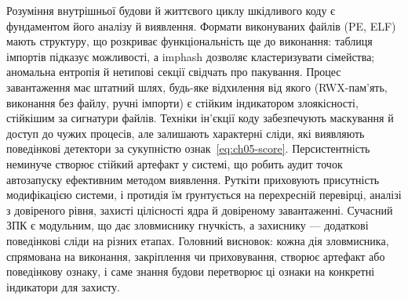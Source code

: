 Розуміння внутрішньої будови й життєвого циклу шкідливого коду є фундаментом його аналізу й виявлення. Формати виконуваних файлів (PE, ELF) мають структуру, що розкриває функціональність ще до виконання: таблиця імпортів підказує можливості, а imphash дозволяє кластеризувати сімейства; аномальна ентропія й нетипові секції свідчать про пакування. Процес завантаження має штатний шлях, будь-яке відхилення від якого (RWX-пам'ять, виконання без файлу, ручні імпорти) є стійким індикатором злоякісності, стійкішим за сигнатури файлів. Техніки ін'єкції коду забезпечують маскування й доступ до чужих процесів, але залишають характерні сліди, які виявляють поведінкові детектори за сукупністю ознак~\eqref{eq:ch05-score}. Персистентність неминуче створює стійкий артефакт у системі, що робить аудит точок автозапуску ефективним методом виявлення. Руткіти приховують присутність модифікацією системи, і протидія їм ґрунтується на перехресній перевірці, аналізі з довіреного рівня, захисті цілісності ядра й довіреному завантаженні. Сучасний ЗПК є модульним, що дає зловмиснику гнучкість, а захиснику --- додаткові поведінкові сліди на різних етапах. Головний висновок: кожна дія зловмисника, спрямована на виконання, закріплення чи приховування, створює артефакт або поведінкову ознаку, і саме знання будови перетворює ці ознаки на конкретні індикатори для захисту.


